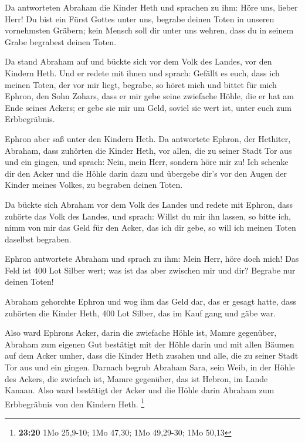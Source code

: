  Da antworteten Abraham die Kinder Heth und sprachen zu
ihm:  Höre uns, lieber Herr! Du bist ein Fürst Gottes
unter uns, begrabe deinen Toten in unseren vornehmsten Gräbern; kein
Mensch soll dir unter uns wehren, dass du in seinem Grabe begrabest
deinen Toten.

 Da stand Abraham auf und bückte sich vor dem Volk des
Landes, vor den Kindern Heth.  Und er redete mit ihnen und
sprach: Gefällt es euch, dass ich meinen Toten, der vor mir liegt,
begrabe, so höret mich und bittet für mich Ephron, den Sohn Zohars,
 dass er mir gebe seine zwiefache Höhle, die er hat am
Ende seines Ackers; er gebe sie mir um Geld, soviel sie wert ist, unter
euch zum Erbbegräbnis.

 Ephron aber saß unter den Kindern Heth. Da antwortete
Ephron, der Hethiter, Abraham, dass zuhörten die Kinder Heth, vor allen,
die zu seiner Stadt Tor aus und ein gingen, und sprach: 
Nein, mein Herr, sondern höre mir zu! Ich schenke dir den Acker und die
Höhle darin dazu und übergebe dir's vor den Augen der Kinder meines
Volkes, zu begraben deinen Toten.

 Da bückte sich Abraham vor dem Volk des Landes
 und redete mit Ephron, dass zuhörte das Volk des Landes,
und sprach: Willst du mir ihn lassen, so bitte ich, nimm von mir das
Geld für den Acker, das ich dir gebe, so will ich meinen Toten daselbst
begraben.

 Ephron antwortete Abraham und sprach zu ihm:
 Mein Herr, höre doch mich! Das Feld ist 400 Lot Silber
wert; was ist das aber zwischen mir und dir? Begrabe nur deinen Toten!

 Abraham gehorchte Ephron und wog ihm das Geld dar, das
er gesagt hatte, dass zuhörten die Kinder Heth, 400 Lot Silber, das im
Kauf gang und gäbe war.

 Also ward Ephrons Acker, darin die zwiefache Höhle ist,
Mamre gegenüber, Abraham zum eigenen Gut bestätigt mit der Höhle darin
und mit allen Bäumen auf dem Acker umher,  dass die
Kinder Heth zusahen und alle, die zu seiner Stadt Tor aus und ein
gingen.  Darnach begrub Abraham Sara, sein Weib, in der
Höhle des Ackers, die zwiefach ist, Mamre gegenüber, das ist Hebron, im
Lande Kanaan.  Also ward bestätigt der Acker und die
Höhle darin Abraham zum Erbbegräbnis von den Kindern Heth. \footnote{\textbf{23:20}
  1Mo 25,9-10; 1Mo 47,30; 1Mo 49,29-30; 1Mo 50,13}

